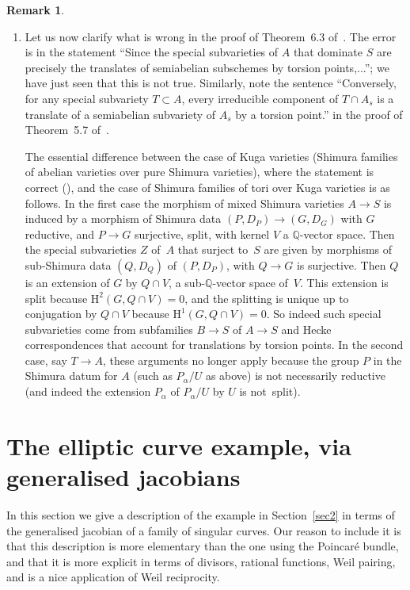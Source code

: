 \documentclass[11pt]{article}
\theoremstyle{plain}
\theoremstyle{definition}
\newtheorem{Remark}[subsection]{Remark}
\numberwithin{equation}{subsection}
\newcommand{\Q}{\mathbb Q}
\newcommand{\rmH}{\mathrm{H}}
\begin{document}
\begin{Remark}
\begin{enumerate}
see~\cite{BMPZ} and~\cite{Bertrand18}.
\item\label{rem_r_f_msv_item_4} Let us now clarify what is wrong in
the proof of Theorem~6.3 of~\cite{Pink2}. The error is in the
statement ``Since the special subvarieties of $A$ that dominate $S$
are precisely the translates of semiabelian subschemes by torsion
points,...''; we have just seen that this is not true. Similarly,
note the sentence ``Conversely, for any special subvariety $T\subset
A$, every irreducible component of $T\cap A_s$ is a translate of a
semiabelian subvariety of $A_s$ by a torsion point.'' in the proof
of Theorem~5.7 of~\cite{Pink2}.\enlargethispage{\baselineskip}%

The essential difference between the case of Kuga varieties (Shimura
families of abelian varieties over pure Shimura varieties), where
the statement is correct (\hbox{\cite[Prop.\,4.6]{Pink1}}), and the
case of Shimura families of tori over Kuga varieties is as
follows. In the first case the morphism of mixed Shimura varieties
$A\to S$ is induced by a morphism of Shimura data $(P,D_P)\to
(G,D_G)$ with $G$ reductive, and $P\to G$ surjective, split, with
kernel $V$ a $\Q$-vector space. Then the special subvarieties $Z$ of~$A$ that surject to~$S$ are given by morphisms of sub-Shimura data
$(Q,D_Q)$ of $(P,D_P)$, with $Q\to G$ is surjective. Then $Q$ is an
extension of $G$ by $Q\cap V$, a sub-$\Q$-vector space of~$V$. This
extension is split because $\rmH^2(G,Q\cap V)=0$, and the splitting
is unique up to conjugation by $Q\cap V$ because $\rmH^1(G,Q\cap
V)=0$. So indeed such special subvarieties come from subfamilies
$B\to S$ of $A\to S$ and Hecke correspondences that account for
translations by torsion points. In the second case, say $T\to A$,
these arguments no longer apply because the group $P$ in the Shimura
datum for $A$ (such as $P_\alpha/U$ as above) is not necessarily
reductive (and indeed the extension $P_\alpha$ of $P_\alpha/U$ by
$U$ is not~split).
\end{enumerate}
\end{Remark}

\section{The elliptic curve example, via generalised
jacobians}\label{sec6}

In this section we give a description of the example in
Section~\ref{sec2} in terms of the generalised jacobian of a family of
singular curves. Our reason to include it is that this description is
more elementary than the one using the Poincaré bundle, and that it
is more explicit in terms of divisors, rational functions, Weil
pairing, and is a nice application of Weil reciprocity.
\end{document}
